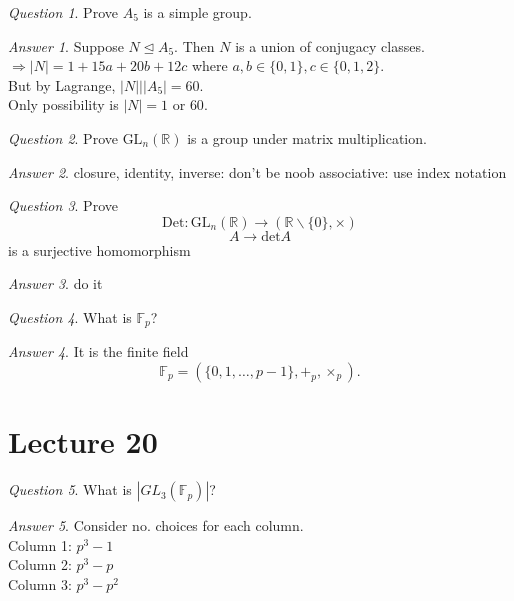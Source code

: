 \documentclass[]{article}
\theoremstyle{remark}
\theoremstyle{qnstyle}
\newtheorem{question}{Question}
\theoremstyle{answerstyle}
\newtheorem*{answer}{Answer}
\begin{document}
\begin{question}
    Prove $A_5$ is a simple group.
\end{question}
\begin{answer}
    Suppose $N \trianglelefteq A_5$. Then $N$ is a union of conjugacy classes. \\
    $\Rightarrow |N| = 1 + 15a + 20b + 12c$ where $a,b \in \{0, 1\}, c \in \{0,1,2\}$. \\
    But by Lagrange, $|N| \big \vert |A_5| = 60$.\\
    Only possibility is $|N| = 1$ or $60$.
\end{answer}

\begin{question}
    Prove $\text{GL}_n(\mathbb{R})$ is a group under matrix multiplication.
\end{question}
\begin{answer}
    closure, identity, inverse: don't be noob
    associative: use index notation
\end{answer}

\begin{question}
    Prove $$\text{Det}: \text{GL}_n(\mathbb{R}) \to (\mathbb{R} \backslash \{0\}, \times)$$
        $$A \to \text{det}A$$
    is a surjective homomorphism
\end{question}
\begin{answer}
    do it
\end{answer}

\begin{question}
    What is $\mathbb{F}_p$?
\end{question}
\begin{answer}
    It is the finite field $$\mathbb{F}_p = (\{0,1,\ldots,p-1\}, +_p, \times_p).$$
\end{answer}








\section* {Lecture 20}

\begin{question}
    What is $|GL_3(\mathbb{F}_p)|$?
\end{question}
\begin{answer}
    Consider no. choices for each column. \\
    Column 1: $p^3 - 1$ \\
    Column 2: $p^3 - p$\\
    Column 3: $p^3 - p^2$
\end{answer}
\end{document}
